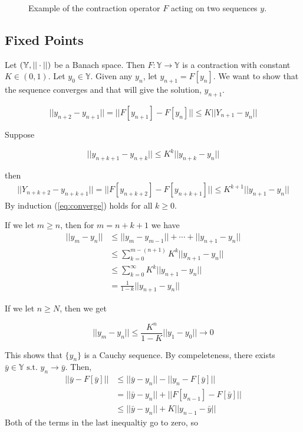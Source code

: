 \begin{figure}[ht!]
\centering
{} \hfill
{}
\caption{Example of the contraction operator $F$ acting on two sequences $y$.}%
\label{fig:07contraction}
\end{figure}

\subsection{Fixed Points}
Let $(\mathbb{Y},||\cdot||)$ be a Banach space.
Then $F:\mathbb{Y}\to\mathbb{Y}$ is a contraction with constant $K\in(0,1)$.
Let $y_0\in\mathbb{Y}$.
Given any $y_n$, let $y_{n+1}=F[y_n]$.
We want to show that the sequence converges and that will give the solution, $y_{n+1}$.

\begin{equation*}
||y_{n+2}-y_{n+1}|| = ||F[y_{n+1}]-F[y_n]|| \leq K||Y_{n+1}-y_n||
\end{equation*}

Suppose

\begin{equation*}
||y_{n+k+1}-y_{n+k}||\leq K^k||y_{n+k}-y_n||
\end{equation*}

then
\begin{align}
\label{eq:converge}
||Y_{n+k+2}-y_{n+k+1}|| = ||F[y_{n+k+2}]-F[y_{n+k+1}]|| \leq K^{k+1}||y_{n+1}-y_n||
\end{align}
By induction (\ref{eq:converge}) holds for all $k\geq0$.

If we let $m\geq n$, then for $m=n+k+1$ we have
\begin{align*}
||y_m-y_n|| &\leq ||y_m-y_{m-1}|| + \cdots + ||y_{n+1}-y_n|| \\
&\leq \sum_{k=0}^{m-(n+1)} K^k||y_{n+1}-y_n|| \\
&\leq \sum_{k=0}^\infty K^k||y_{n+1}-y_n|| \\
&= \frac{1}{1-k}||y_{n+1}-y_n||
\end{align*}

If we let $n\geq N$, then we get

\begin{equation*}
||y_m-y_n|| \leq \frac{K^n}{1-K}||y_1-y_0||\to0
\end{equation*}

This shows that $\{y_n\}$ is a Cauchy sequence.
By compeleteness, there exists $\bar{y}\in\mathbb{Y}\text{~s.t.~} y_n\to\bar{y}$.
Then,
\begin{align*}
||\bar{y}-F[\bar{y}]|| &\leq ||\bar{y}-y_n|| - ||y_n-F[\bar{y}]|| \\
&= ||\bar{y}-y_n|| + ||F[y_{n-1}]-F[\bar{y}]|| \\
&\leq ||\bar{y}-y_n|| + K||y_{n-1}-\bar{y}||
\end{align*}
Both of the terms in the last inequaltiy go to zero, so

